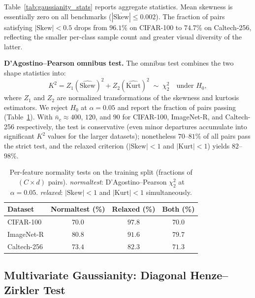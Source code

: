Table~\ref{tab:gaussianity_stats} reports aggregate statistics. Mean skewness is essentially zero on all benchmarks ($|\overline{\mathrm{Skew}}| \le 0.002$). The fraction of pairs satisfying $|\mathrm{Skew}|<0.5$ drops from $96.1\%$ on CIFAR-100 to $74.7\%$ on Caltech-256, reflecting the smaller per-class sample count and greater visual diversity of the latter.

\textbf{D'Agostino--Pearson omnibus test.}
The omnibus test combines the two shape statistics into:
\begin{equation}
    K^2 = Z_1(\widehat{\mathrm{Skew}})^2 + Z_2(\widehat{\mathrm{Kurt}})^2 \;\sim\; \chi^2_2 \quad \text{under } H_0,
    \label{eq:normaltest_results}
\end{equation}
where $Z_1$ and $Z_2$ are normalized transformations of the skewness and kurtosis estimators. We reject $H_0$ at $\alpha=0.05$ and report the fraction of pairs passing (Table~\ref{tab:gaussianity_normaltest}). With $\bar{n}_c \approx 400$, $120$, and $90$ for CIFAR-100, ImageNet-R, and Caltech-256 respectively, the test is conservative (even minor departures accumulate into significant $K^2$ values for the larger datasets); nonetheless $70$--$81\%$ of all pairs pass the strict test, and the relaxed criterion ($|\mathrm{Skew}|<1$ and $|\mathrm{Kurt}|<1$) yields $82$--$98\%$.

\begin{table}[htb]
    \centering
    \caption{Per-feature normality tests on the training split (fractions of $(C \times d)$ pairs). \emph{normaltest}: D'Agostino--Pearson $\chi^2_2$ at $\alpha{=}0.05$. \emph{relaxed}: $|\mathrm{Skew}|<1$ and $|\mathrm{Kurt}|<1$ simultaneously.}
    \label{tab:gaussianity_normaltest}
    \scriptsize
    \setlength{\tabcolsep}{6pt}
    \begin{tabular}{lccc}
        \toprule
        \textbf{Dataset} & \textbf{Normaltest (\%)} & \textbf{Relaxed (\%)} & \textbf{Both (\%)} \\
        \midrule
        CIFAR-100   & $70.0$ & $97.8$ & $70.0$ \\
        ImageNet-R  & $80.8$ & $91.6$ & $79.7$ \\
        Caltech-256 & $73.4$ & $82.3$ & $71.3$ \\
        \bottomrule
    \end{tabular}
\end{table}

\subsection{Multivariate Gaussianity: Diagonal Henze--Zirkler Test}
\label{sec:mv_gaussianity_results}

